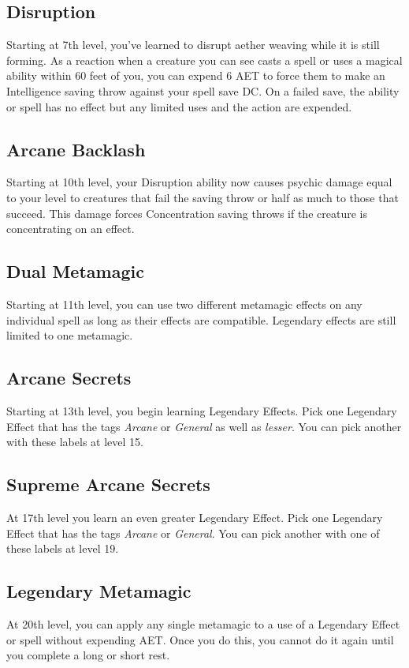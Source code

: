 \subsection{Disruption}

Starting at 7th level, you've learned to disrupt aether weaving while it is still forming. As a reaction when a creature you can see casts a spell or uses a magical ability within 60 feet of you, you can expend 6 AET to force them to make an Intelligence saving throw against your spell save DC. On a failed save, the ability or spell has no effect but any limited uses and the action are expended.

\subsection{Arcane Backlash}

Starting at 10th level, your Disruption ability now causes psychic damage equal to your level to creatures that fail the saving throw or half as much to those that succeed. This damage forces Concentration saving throws if the creature is concentrating on an effect.

\subsection{Dual Metamagic}

Starting at 11th level, you can use two different metamagic effects on any individual spell as long as their effects are compatible. Legendary effects are still limited to one metamagic.

\subsection{Arcane Secrets}
Starting at 13th level, you begin learning Legendary Effects. Pick one Legendary Effect that has the tags \textit{Arcane} or \textit{General} as well as \textit{lesser}. You can pick another with these labels at level 15.

\subsection{Supreme Arcane Secrets}
At 17th level you learn an even greater Legendary Effect. Pick one Legendary Effect that has the tags \textit{Arcane} or \textit{General}. You can pick another with one of these labels at level 19.

\subsection{Legendary Metamagic}
At 20th level, you can apply any single metamagic to a use of a Legendary Effect or spell without expending AET. Once you do this, you cannot do it again until you complete a long or short rest.

